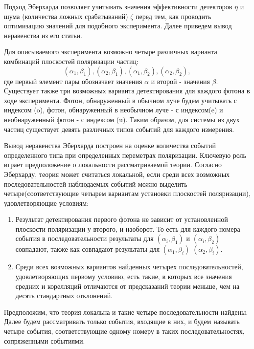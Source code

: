 \documentclass[%
master,         %
subf,           %
href,           %
,times         %
]{disser}
\numberwithin{equation}{section}
\numberwithin{figure}{section}
\begin{document}
Подход Эберхарда позволяет учитывать значения эффективности детекторов $\eta$ и шума (количества ложных срабатываний) $\zeta$ перед тем, как проводить оптимизацию значений для подобного эксперимента. Далее приведем вывод неравенства из его статьи.

Для описываемого эксперимента возможно четыре различных варианта комбинаций плоскостей поляризации частиц: 
\[
(\alpha_1, \beta_1), (\alpha_2, \beta_1), (\alpha_1, \beta_2), (\alpha_2, \beta_2),
\]
где первый элемент пары обозначает значения $\alpha$ и второй - значения $\beta$. Существует также три возможных варианта детектирования для каждого фотона в ходе эксперимента. Фотон, обнаруженный в обычном луче будем учитывать с индексом (o), фотон, обнаруженный в необычном луче - с индексом(e) и необнаруженный фотон - с индексом (u). Таким образом, для системы из двух частиц существует девять различных типов событий для каждого измерения.

Вывод неравенства Эберхарда построен на оценке количества событий определенного типа при определенных переметрах поляризации. Ключевую роль играет предположение о локальности рассматриваемой теории. Согласно Эберхарду, теория может считаться локальной, если среди всех возможных последовательностей наблюдаемых событий можно выделить четыре(соответствующие четырем вариантам установки плоскостей поляризации), удовлетворяющие условиям:
\begin{enumerate}[label=(\roman*)]
\item Результат детектирования первого фотона не зависит от установленной плоскости поляризации у второго, и наоборот. То есть для каждого номера события в последовательности результаты для $(\alpha_i, \beta_1)$ и $(\alpha_i, \beta_2)$ совпадают, также как совпадают результаты для $(\alpha_1, \beta_i)$ $(\alpha_2, \beta_i)$.
\item Среди всех возможных вариантов найденных четырех последовательностей, удовлетворяющих первому условию, есть такие, в которых все значения средних и корелляций отличаются от предсказаний теории меньше, чем на десять стандартных отклонений.
\end{enumerate}

Предположим, что теория локальна и такие четыре последовательности найдены. Далее будем рассматривать только события, входящие в них, и будем называть четыре события, соответствующие одному номеру в таких последовательностях, сопряженными событиями. 
\end{document}
